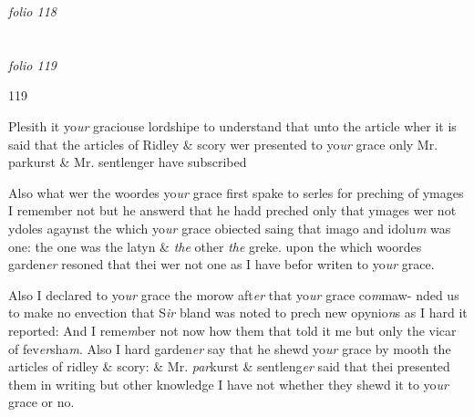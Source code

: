 \documentclass[12pt, a4paper]{book}
\begin{document}
\textit{folio 118}


         \vspace{4cm}
         
\dotfill
					  \section*{}

\textit{folio 119}



\begin{flushright}{\color{Mahogany}119}\end{flushright}
            		
		\ifthenelse{\isodd{\thepage}}
		{\reversemarginpar}
		{\normalmarginpar}
		Plesith it yo\textit{ur} graciouse lordshipe to understand that unto the
            			article wher it is said that the articles of Ridley \& scory
            			wer presented to yo\textit{ur} grace only Mr. parkurst \& Mr. sentlenger
 have subscribed
            			
		\ifthenelse{\isodd{\thepage}}
		{\reversemarginpar}
		{\normalmarginpar}
		Also what wer the woordes yo\textit{ur} grace first spake to serles for
 preching of ymages I remember not but he answerd
 that he hadd preched only that ymages wer not ydoles
 agaynst the which yo\textit{ur} grace obiected saing that imago and
 idolu\textit{m} was one: the one was the latyn \& \textit{the} other \textit{the} greke.
            				upon the which woordes garden\textit{er} resoned that thei wer not
            				one as I have befor writen to yo\textit{ur} grace.
            			
		\ifthenelse{\isodd{\thepage}}
		{\reversemarginpar}
		{\normalmarginpar}
		Also I declared to yo\textit{ur} grace the morow aft\textit{er} that yo\textit{ur} grace co\textit{m}maw-
            				nded us to make no envection that S\textit{ir} bland was noted to
 prech new opynio\textit{n}s as I hard it reported: And I reme\textit{m}ber not
            				now how them that told it me but only the vicar of fev\textit{er}sha\textit{m}.
            				Also I hard garden\textit{er} say that he shewd yo\textit{ur} grace by mooth the
            				articles of ridley \& scory: \& Mr. \textit{par}kurst \& sentleng\textit{er} said that
 thei presented them in writing but other knowledge I have
 not whether they shewd it to yo\textit{ur} grace or no.


\dotfill
					
\end{document}
